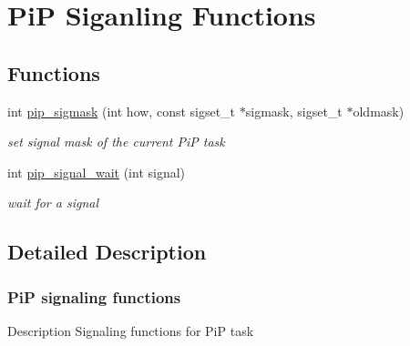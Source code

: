 \hypertarget{group__PiP-6-signal}{\section{Pi\-P Siganling Functions}
\label{group__PiP-6-signal}
}
\subsection*{Functions}
\begin{DoxyCompactItemize}
\item 
int \hyperlink{group__PiP-6-signal_gaf546ee24368b118e937aadd2dbea2217}{pip\-\_\-sigmask} (int how, const sigset\-\_\-t $\ast$sigmask, sigset\-\_\-t $\ast$oldmask)
\begin{DoxyCompactList}\small\item\em set signal mask of the current Pi\-P task \end{DoxyCompactList}\item 
int \hyperlink{group__PiP-6-signal_ga2048e7685a030e61e8c529c474899feb}{pip\-\_\-signal\-\_\-wait} (int signal)
\begin{DoxyCompactList}\small\item\em wait for a signal \end{DoxyCompactList}\end{DoxyCompactItemize}


\subsection{Detailed Description}
\hypertarget{pip-signal}{}\subsubsection{Pi\-P signaling functions}\label{pip-signal}
\begin{DoxyParagraph}{Description}
Signaling functions for Pi\-P task 
\end{DoxyParagraph}


